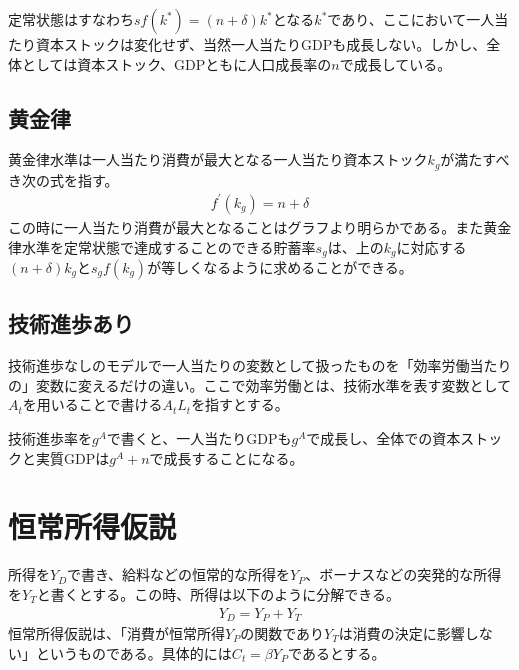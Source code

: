 \documentclass{jsarticle}
\begin{document}
定常状態はすなわち$sf(k^*) = (n+\delta)k^*$となる$k^*$であり、ここにおいて一人当たり資本ストックは変化せず、当然一人当たりGDPも成長しない。しかし、全体としては資本ストック、GDPともに人口成長率の$n$で成長している。

\subsection{黄金律}
黄金律水準は一人当たり消費が最大となる一人当たり資本ストック$k_g$が満たすべき次の式を指す。
\begin{align*}
	f^{'}(k_g) = n+\delta
\end{align*}
この時に一人当たり消費が最大となることはグラフより明らかである。また黄金律水準を定常状態で達成することのできる貯蓄率$s_g$は、上の$k_g$に対応する$(n+\delta)k_g$と$s_g f(k_g)$が等しくなるように求めることができる。

\subsection{技術進歩あり}
技術進歩なしのモデルで一人当たりの変数として扱ったものを「効率労働当たりの」変数に変えるだけの違い。ここで効率労働とは、技術水準を表す変数として$A_t$を用いることで書ける$A_t L_t$を指すとする。

技術進歩率を$g^A$で書くと、一人当たりGDPも$g^A$で成長し、全体での資本ストックと実質GDPは$g^A + n$で成長することになる。

\section{恒常所得仮説}
所得を$Y_D$で書き、給料などの恒常的な所得を$Y_P$、ボーナスなどの突発的な所得を$Y_T$と書くとする。この時、所得は以下のように分解できる。
\begin{align*}
Y_D = Y_P + Y_T
\end{align*}
恒常所得仮説は、「消費が恒常所得$Y_P$の関数であり$Y_T$は消費の決定に影響しない」というものである。具体的には$C_t = \beta Y_P$であるとする。
\end{document}
